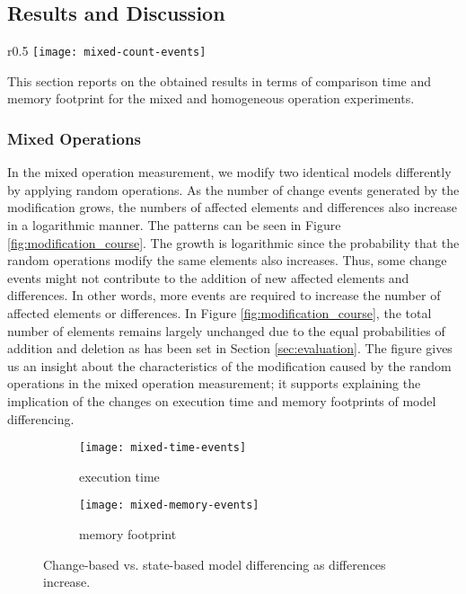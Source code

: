 \subsection{Results and Discussion}
\label{sec:results_and_discussion}

\begin{wrapfigure}[9]{r}{0.5\textwidth}
  \vspace{-20pt}
  \texttt{[image: mixed-count-events]}
  \caption{total elements, affected elements, and diffs}
  \label{fig:modification_course}
\end{wrapfigure}

This section reports on the obtained results in terms of comparison time and memory footprint for the mixed and homogeneous operation experiments. 


\vspace{-5pt}
\subsubsection{Mixed Operations}
\label{sec:mixed-operation}
In the mixed operation measurement, we modify two identical models differently by applying random operations. As the number of change events generated by the modification grows, the numbers of affected elements and differences also increase in a logarithmic manner. The patterns can be seen in Figure \ref{fig:modification_course}. The growth is logarithmic since the probability that the random operations modify the same elements also increases. Thus, some change events might not contribute to the addition of new affected elements and differences. In other words, more events are required to increase the number of affected elements or differences. In Figure \ref{fig:modification_course}, the total number of elements remains largely unchanged due to the equal probabilities of addition and deletion as has been set in Section \ref{sec:evaluation}. The figure gives us an insight about the characteristics of the modification caused by the random operations in the mixed operation measurement; it supports explaining the implication of the changes on execution time and memory footprints of model differencing.

\begin{figure}[ht]
  \begin{subfigure}[t]{0.495\linewidth}
    \texttt{[image: mixed-time-events]}
    \caption{execution time}
    \label{fig:time_diffs}
  \end{subfigure}
  \begin{subfigure}[t]{0.495\linewidth}
    \texttt{[image: mixed-memory-events]}
    \caption{memory footprint}
    \label{fig:memory_diffs}
  \end{subfigure}
  \caption{Change-based vs. state-based model differencing as differences increase.}
  \label{fig:change_vs_state}
\end{figure}


